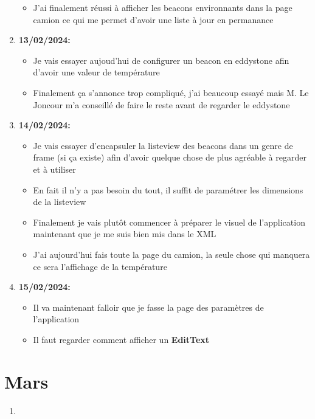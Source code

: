 \documentclass[10pt,a4paper]{book}
\begin{document}
\begin{enumerate}
\begin{itemize}
            \item J'ai finalement réussi à afficher les beacons environnants dans la page camion ce qui me permet d'avoir une liste à jour en permanance
        \end{itemize}
    \item \textbf{13/02/2024:}
        \begin{itemize}
            \item Je vais essayer aujoud'hui de configurer un beacon en eddystone afin d'avoir une valeur de température
            \item Finalement ça s'annonce trop compliqué, j'ai beaucoup essayé mais M. Le Joncour m'a conseillé de faire le reste avant de regarder le eddystone
        \end{itemize}
    \item \textbf{14/02/2024:}
        \begin{itemize}
            \item Je vais essayer d'encapsuler la listeview des beacons dans un genre de frame (si ça existe) afin d'avoir quelque chose de plus agréable à regarder et à utiliser
            \item En fait il n'y a pas besoin du tout, il suffit de paramétrer les dimensions de la listeview
            \item Finalement je vais plutôt commencer à préparer le visuel de l'application maintenant que je me suis bien mis dans le XML
            \item J'ai aujourd'hui fais toute la page du camion, la seule chose qui manquera ce sera l'affichage de la température
        \end{itemize}
    \item \textbf{15/02/2024:}
        \begin{itemize}
            \item Il va maintenant falloir que je fasse la page des paramètres de l'application
            \item Il faut regarder comment afficher un \textbf{EditText}
        \end{itemize}
\end{enumerate}

\chapter{Mars}

\begin{enumerate}
    \item 
\end{enumerate}
\end{document}

